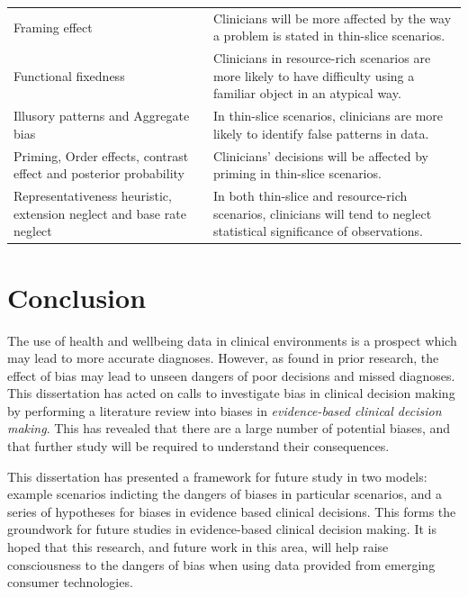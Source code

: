 \documentclass[a4paper]{scrartcl}     %
\newif\ifbreaksection
\begin{document}
\begin{table}[htb]
\begin{tabu}{X[2,l] X[5,p]}
      Framing effect
        & Clinicians will be more affected by the way a problem is stated in thin-slice scenarios. \\

      Functional fixedness
        & Clinicians in resource-rich scenarios are more likely to have difficulty using a familiar object in an atypical way. \\

      Illusory patterns and Aggregate bias
        & In thin-slice scenarios, clinicians are more likely to identify false patterns in data. \\

      Priming, Order effects, contrast effect and posterior probability
        & Clinicians' decisions will be affected by priming in thin-slice scenarios. \\

      Representativeness heuristic, extension neglect and base rate neglect
        & In both thin-slice and resource-rich scenarios, clinicians will tend to neglect statistical significance of observations. \\
      \bottomrule
      \end{tabu}
      \label{table:hypotheses}
    \end{table}


\ifbreaksection\clearpage\fi\section{Conclusion} %

  The use of health and wellbeing data in clinical environments is a prospect which may lead to more accurate diagnoses. However, as found in prior research, the effect of bias may lead to unseen dangers of poor decisions and missed diagnoses. This dissertation has acted on calls to investigate bias in clinical decision making by performing a literature review into biases in \textit{evidence-based clinical decision making}. This has revealed that there are a large number of potential biases, and that further study will be required to understand their consequences.

  This dissertation has presented a framework for future study in two models: example scenarios indicting the dangers of biases in particular scenarios, and a series of hypotheses for biases in evidence based clinical decisions. This forms the groundwork for future studies in evidence-based clinical decision making. It is hoped that this research, and future work in this area, will help raise consciousness to the dangers of bias when using data provided from emerging consumer technologies.





\ifbreaksection\clearpage\fi


\end{document}
